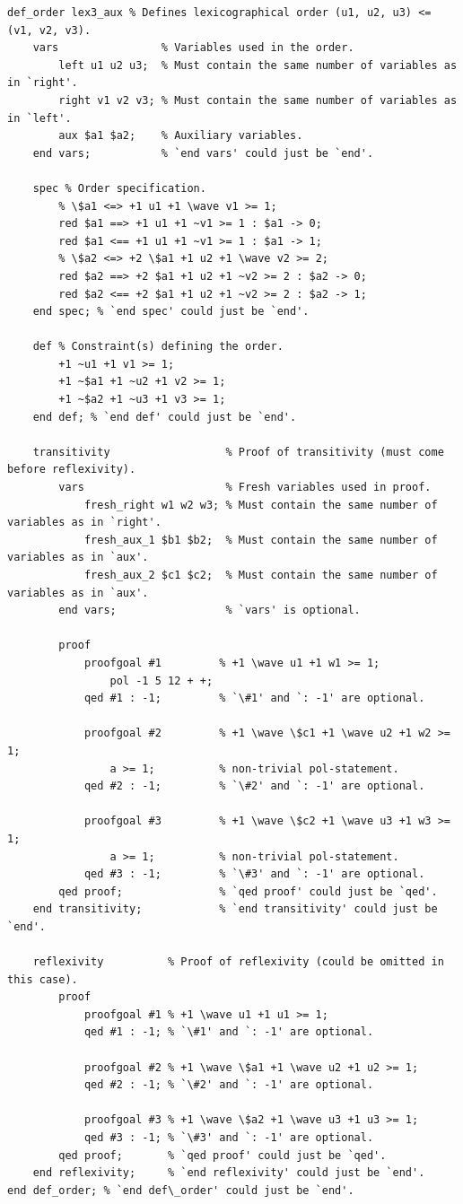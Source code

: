\documentclass[a4paper]{article}
\newcommand{\wave}[0]{\raisebox{0.5ex}{\texttildelow}}
\begin{document}
\begin{lstlisting}[language=veripb]
def_order lex3_aux % Defines lexicographical order (u1, u2, u3) <= (v1, v2, v3).
	vars                % Variables used in the order.
		left u1 u2 u3;  % Must contain the same number of variables as in `right'.
		right v1 v2 v3; % Must contain the same number of variables as in `left'.
		aux $a1 $a2;    % Auxiliary variables.
	end vars;           % `end vars' could just be `end'.

	spec % Order specification.
		% \$a1 <=> +1 u1 +1 \wave v1 >= 1;
		red $a1 ==> +1 u1 +1 ~v1 >= 1 : $a1 -> 0;
		red $a1 <== +1 u1 +1 ~v1 >= 1 : $a1 -> 1;
		% \$a2 <=> +2 \$a1 +1 u2 +1 \wave v2 >= 2;
		red $a2 ==> +2 $a1 +1 u2 +1 ~v2 >= 2 : $a2 -> 0;
		red $a2 <== +2 $a1 +1 u2 +1 ~v2 >= 2 : $a2 -> 1;
	end spec; % `end spec' could just be `end'.

	def % Constraint(s) defining the order.
		+1 ~u1 +1 v1 >= 1;
		+1 ~$a1 +1 ~u2 +1 v2 >= 1;
		+1 ~$a2 +1 ~u3 +1 v3 >= 1;
	end def; % `end def' could just be `end'.

	transitivity                  % Proof of transitivity (must come before reflexivity).
		vars                      % Fresh variables used in proof.
			fresh_right w1 w2 w3; % Must contain the same number of variables as in `right'.
			fresh_aux_1 $b1 $b2;  % Must contain the same number of variables as in `aux'.
			fresh_aux_2 $c1 $c2;  % Must contain the same number of variables as in `aux'.
		end vars;                 % `vars' is optional.

		proof
			proofgoal #1         % +1 \wave u1 +1 w1 >= 1;
				pol -1 5 12 + +;
			qed #1 : -1;         % `\#1' and `: -1' are optional.

			proofgoal #2         % +1 \wave \$c1 +1 \wave u2 +1 w2 >= 1;
				a >= 1;          % non-trivial pol-statement.
			qed #2 : -1;         % `\#2' and `: -1' are optional.

			proofgoal #3         % +1 \wave \$c2 +1 \wave u3 +1 w3 >= 1;
				a >= 1;          % non-trivial pol-statement.
			qed #3 : -1;         % `\#3' and `: -1' are optional.
		qed proof;               % `qed proof' could just be `qed'.
	end transitivity;            % `end transitivity' could just be `end'.

	reflexivity          % Proof of reflexivity (could be omitted in this case).
		proof
			proofgoal #1 % +1 \wave u1 +1 u1 >= 1;
			qed #1 : -1; % `\#1' and `: -1' are optional.

			proofgoal #2 % +1 \wave \$a1 +1 \wave u2 +1 u2 >= 1;
			qed #2 : -1; % `\#2' and `: -1' are optional.

			proofgoal #3 % +1 \wave \$a2 +1 \wave u3 +1 u3 >= 1;
			qed #3 : -1; % `\#3' and `: -1' are optional.
		qed proof;       % `qed proof' could just be `qed'.
	end reflexivity;     % `end reflexivity' could just be `end'.
end def_order; % `end def\_order' could just be `end'.
\end{lstlisting}
\end{document}
